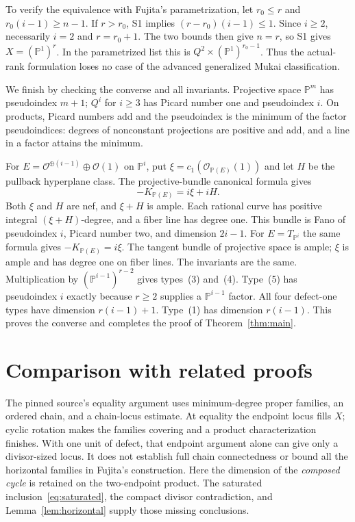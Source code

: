 \documentclass[11pt]{article}
\theoremstyle{definition}\newtheorem{definition}[theorem]{Definition}
\theoremstyle{remark}\newtheorem{remark}[theorem]{Remark}
\newcommand{\PP}{\mathbb P}
\newcommand{\OO}{\mathcal O}
\begin{document}
To verify the equivalence with Fujita's parametrization, let $r_0\le r$ and
$r_0(i-1)\ge n-1$. If $r>r_0$, S1 implies
$(r-r_0)(i-1)\le1$. Since $i\ge2$, necessarily $i=2$ and $r=r_0+1$.
The two bounds then give $n=r$, so S1 gives $X=(\PP^1)^r$. In the
parametrized list this is $Q^2\times(\PP^1)^{r_0-1}$. Thus the actual-rank
formulation loses no case of the advanced generalized Mukai classification.

We finish by checking the converse and all invariants. Projective space
$\PP^m$ has pseudoindex $m+1$; $Q^i$ for $i\ge3$ has Picard number one
and pseudoindex $i$. On products, Picard numbers add and the pseudoindex
is the minimum of the factor pseudoindices: degrees of nonconstant
projections are positive and add, and a line in a factor attains the
minimum.

For $E=\OO^{\oplus(i-1)}\oplus\OO(1)$ on $\PP^i$, put
$\xi=c_1(\OO_{\PP(E)}(1))$ and let $H$ be the pullback hyperplane class.
The projective-bundle canonical formula gives
\[
 -K_{\PP(E)}=i\xi+iH.
\]
Both $\xi$ and $H$ are nef, and $\xi+H$ is ample. Each rational curve has
positive integral $(\xi+H)$-degree, and a fiber line has degree one.
This bundle is Fano of pseudoindex $i$, Picard number two, and dimension
$2i-1$. For $E=T_{\PP^i}$ the same formula gives
$-K_{\PP(E)}=i\xi$. The tangent bundle of projective space is ample;
$\xi$ is ample and has degree one on fiber lines. The invariants are the
same. Multiplication by $(\PP^{i-1})^{r-2}$ gives types~(3) and~(4).
Type~(5) has pseudoindex $i$ exactly because $r\ge2$ supplies a
$\PP^{i-1}$ factor. All four defect-one types have dimension
$r(i-1)+1$. Type~(1) has dimension $r(i-1)$. This proves the converse
and completes the proof of Theorem~\ref{thm:main}.

\section{Comparison with related proofs}\label{sec:comparison}
The pinned source's equality argument uses minimum-degree proper families,
an ordered chain, and a chain-locus estimate. At equality the endpoint locus
fills $X$; cyclic rotation makes the families covering and a product
characterization finishes. With one unit of defect, that endpoint argument
alone can give only a divisor-sized locus. It does not establish full chain
connectedness or bound all the horizontal families in Fujita's construction.
Here the dimension of the \emph{composed cycle} is retained on the
two-endpoint product. The saturated inclusion~\eqref{eq:saturated}, the
compact divisor contradiction, and Lemma~\ref{lem:horizontal} supply those
missing conclusions.
\end{document}
